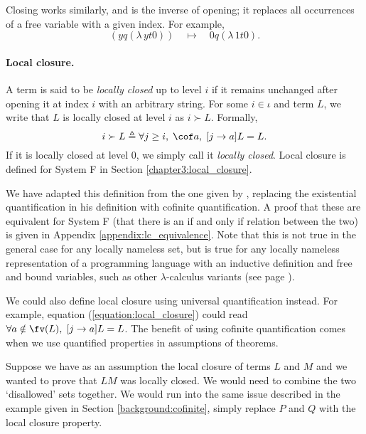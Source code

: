 Closing works similarly, and is the inverse of opening; it replaces all occurrences of a free
variable with a given index. For example,
\begin{equation*}
  [0 \leftarrow y] (y q (\lambda \, y t 0)) \quad \mapsto \quad 0 q (\lambda \, 1 t 0).
\end{equation*}

\paragraph*{Local closure.} A term is said to be \textit{locally closed} up to level $i$ if it
remains unchanged after opening it at index $i$ with an arbitrary string. For some $i \in \iota$ and
term $L$, we write that $L$ is locally closed at level $i$ as $i \succ L$. Formally,
\begin{equation}
  \label{equation:local_closure}
  i \succ L \triangleq \forall j \geq i, \; \cof a , \; [j \to a] L = L.
\end{equation}
If it is locally closed at level $0$, we simply call it \textit{locally closed}. Local closure is
defined for System F in Section \ref{chapter3:local_closure}.

We have adapted this definition from the one given by \citet{pitts_locally_2023}, replacing the
existential quantification in his definition with cofinite quantification. A proof that these are
equivalent for System F (that there is an if and only if relation between the two) is given in
Appendix \ref{appendix:lc_equivalence}. Note that this is not true in the general case for any
locally nameless set, but is true for any locally nameless representation of a programming language
with an inductive definition and free and bound variables, such as other $\lambda$-calculus variants
(see page \pageref{appendix:lc_note}).

We could also define local closure using universal quantification instead. For example, equation
(\ref{equation:local_closure}) could read $\forall a \notin \fv(L), \; [j \to a] L = L$. The benefit
of using cofinite quantification comes when we use quantified properties in assumptions of theorems.

Suppose we have as an assumption the local closure of terms $L$ and $M$ and we wanted to prove that
$LM$ was locally closed. We would need to combine the two `disallowed' sets together. We would run
into the same issue described in the example given in Section \ref{background:cofinite}, simply
replace $P$ and $Q$ with the local closure property.
